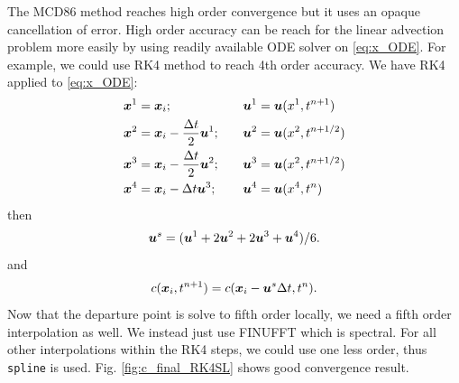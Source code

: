 \documentclass[11pt,letterpaper]{article}
\begin{document}
The MCD86 method reaches high order convergence but it uses an opaque cancellation of error. High order accuracy can be reach for the linear advection problem more easily by using readily available ODE solver on \eqref{eq:x_ODE}. For example, we could use RK4 method to reach 4th order accuracy. We have RK4 applied to \eqref{eq:x_ODE}:
\begin{align*}
    \boldsymbol{x}^1 &= \boldsymbol{x}_i;\quad &&\boldsymbol{u}^1 = \boldsymbol{u}(x^1,t^{n+1})\\
    \boldsymbol{x}^2 &= \boldsymbol{x}_i - \frac{\Delta t}{2} \boldsymbol{u}^1;\quad&&\boldsymbol{u}^2 = \boldsymbol{u}(x^2,t^{n+1/2})\\
    \boldsymbol{x}^3 &= \boldsymbol{x}_i - \frac{\Delta t}{2} \boldsymbol{u}^2;\quad&&\boldsymbol{u}^3 = \boldsymbol{u}(x^2,t^{n+1/2})\\
    \boldsymbol{x}^4 &= \boldsymbol{x}_i - \Delta t \boldsymbol{u}^3;\quad&&\boldsymbol{u}^4 = \boldsymbol{u}(x^4,t^{n})\\
\end{align*}
then
\begin{align*}
    \boldsymbol{u}^s = (\boldsymbol{u}^1+2\boldsymbol{u}^2+2\boldsymbol{u}^3+\boldsymbol{u}^4)/6.
\end{align*}
and 
\begin{align*}
    c(\boldsymbol{x}_i,t^{n+1}) = c(\boldsymbol{x}_i-\boldsymbol{u}^s\Delta t,t^{n}).
\end{align*}
Now that the departure point is solve to fifth order locally, we need a fifth order interpolation as well. We instead just use FINUFFT which is spectral. For all other interpolations within the RK4 steps, we could use one less order, thus \texttt{spline} is used. Fig. \ref{fig:c_final_RK4SL} shows good convergence result. 
\end{document}
